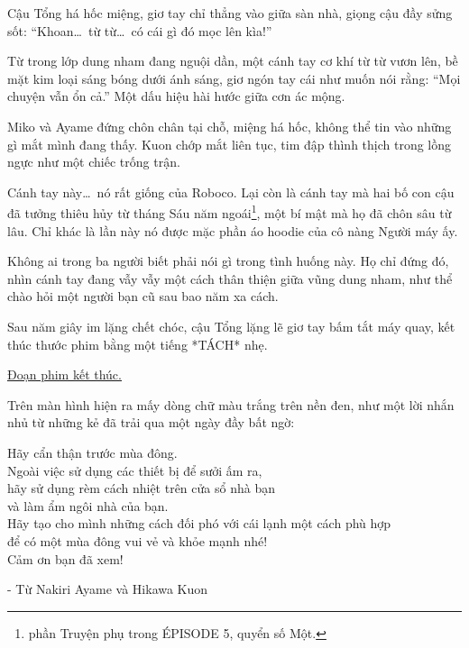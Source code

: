 \documentclass[../main.tex]{subfiles}
\begin{document}
Cậu Tổng há hốc miệng, giơ tay chỉ thẳng vào giữa sàn nhà, giọng cậu đầy sửng sốt: ``Khoan\dots\ từ từ\dots\ có cái gì đó mọc lên kìa!''

Từ trong lớp dung nham đang nguội dần, một cánh tay cơ khí từ từ vươn lên, bề mặt kim loại sáng bóng dưới ánh sáng, giơ ngón tay cái như muốn nói rằng: ``Mọi chuyện vẫn ổn cả.'' Một dấu hiệu hài hước giữa cơn ác mộng.

Miko và Ayame đứng chôn chân tại chỗ, miệng há hốc, không thể tin vào những gì mắt mình đang thấy. Kuon chớp mắt liên tục, tim đập thình thịch trong lồng ngực như một chiếc trống trận.

Cánh tay này\dots\ nó rất giống của Roboco. Lại còn là cánh tay mà hai bố con cậu đã tưởng thiêu hủy từ tháng Sáu năm ngoái\footnote{phần {\abv Truyện phụ} trong {\flaregothic ÉPISODE 5}, quyển số Một.}, một bí mật mà họ đã chôn sâu từ lâu. Chỉ khác là lần này nó được mặc phần áo hoodie của cô nàng Người máy ấy.


Không ai trong ba người biết phải nói gì trong tình huống này. Họ chỉ đứng đó, nhìn cánh tay đang vẫy vẫy một cách thân thiện giữa vũng dung nham, như thể chào hỏi một người bạn cũ sau bao năm xa cách.

Sau năm giây im lặng chết chóc, cậu Tổng lặng lẽ giơ tay bấm tắt máy quay, kết thúc thước phim bằng một tiếng *TÁCH* nhẹ.

\begin{center}
  \uline{Đoạn phim kết thúc.}
\end{center}

Trên màn hình hiện ra mấy dòng chữ màu trắng trên nền đen, như một lời nhắn nhủ từ những kẻ đã trải qua một ngày đầy bất ngờ:

\begin{tcolorbox}[colframe=vol, colback=white, boxrule=0.5pt, arc=0mm, left=5pt, right=5pt, top=5pt, bottom=5pt]

  \begin{center}
    Hãy cẩn thận trước mùa đông.\\
    Ngoài việc sử dụng các thiết bị để sưởi ấm ra,\\
    hãy sử dụng rèm cách nhiệt trên cửa sổ nhà bạn\\
    và làm ẩm ngôi nhà của bạn.\\
    Hãy tạo cho mình những cách đối phó với cái lạnh một cách phù hợp\\
    để có một mùa đông vui vẻ và khỏe mạnh nhé!\\
    Cảm ơn bạn đã xem!\\
  \end{center}
  \hfill - Từ Nakiri Ayame và Hikawa Kuon
\end{tcolorbox}
\end{document}

